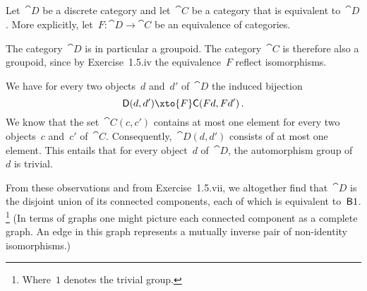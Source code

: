 \subsection{}

Let~$\cat{D}$ be a discrete category and let~$\cat{C}$ be a category that is equivalent to~$\cat{D}$.
More explicitly, let~$F \colon \cat{D} \to \cat{C}$ be an equivalence of categories.

The category~$\cat{D}$ is in particular a groupoid.
The category~$\cat{C}$ is therefore also a groupoid, since by Exercise~1.5.iv the equivalence~$F$ reflect isomorphisms.

We have for every two objects~$d$ and~$d'$ of~$\cat{D}$ the induced bijection
\[
	\cat{D}(d, d') \xto{F} \cat{C}(F d, F d') \,.
\]
We know that the set~$\cat{C}(c, c')$ contains at most one element for every two objects~$c$ and~$c'$ of~$\cat{C}$.
Consequently,~$\cat{D}(d, d')$ consists of at most one element.
This entails that for every object~$d$ of~$\cat{D}$, the automorphism group of~$d$ is trivial.

From these observations and from Exercise~1.5.vii, we altogether find that~$\cat{D}$ is the disjoint union of its connected components, each of which is equivalent to~$\mathsf{B} 1$.%
\footnote{Where~$1$ denotes the trivial group.}
(In terms of graphs one might picture each connected component as a complete graph.
An edge in this graph represents a mutually inverse pair of non-identity isomorphisms.)
